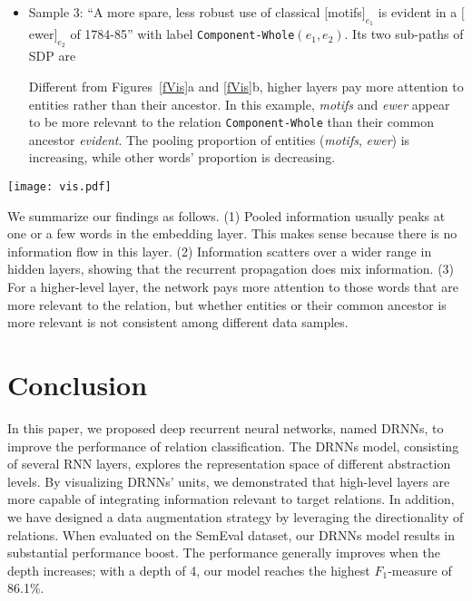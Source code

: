 \documentclass[11pt]{article}
\begin{document}
\begin{itemize}
\item Sample 3: ``A more spare, less robust use of classical $[$motifs$]_{e_1}$ is evident in a $[$ewer$]_{e_2}$ of 1784-85'' with label \verb|Component-Whole|$({e_1}, {e_2})$.
    Its two sub-paths of SDP are
 Different from Figures~\ref{fVis}a and \ref{fVis}b, higher layers pay more attention to entities rather than their ancestor. In this example, \textit{motifs} and \textit{ewer} appear to be more relevant to the relation \verb|Component-|\verb|Whole| than their common ancestor \textit{evident}.
The pooling proportion of entities (\textit{motifs}, \textit{ewer}) is increasing, while other words' proportion is decreasing.

\end{itemize}


\begin{figure*}[!t]
\centering
\texttt{[image: vis.pdf]}
\caption{Visualization of information propagation along multiple RNN layers.}
\label{fVis}
\end{figure*}
We summarize our findings as follows. (1) Pooled information usually peaks at one or a few words in the embedding layer. This makes sense because there is no information flow in this layer.  (2) Information scatters over a wider range in hidden layers, showing that the recurrent propagation does  mix information. (3) For a higher-level layer, the network pays more attention to those words that are more relevant to the relation, but whether entities or their common ancestor is more relevant is not consistent among different data samples.



\section{Conclusion}\label{sConclusion}
In this paper, we proposed deep recurrent neural networks, named DRNNs, to improve the performance of relation classification. The DRNNs model, consisting of several RNN layers, explores the representation space of different abstraction levels. By visualizing  DRNNs' units, we demonstrated that high-level layers are more capable of integrating information relevant to target relations. In addition, we have designed a data augmentation strategy by leveraging the directionality of relations.
When evaluated on the SemEval dataset, our DRNNs model results in substantial performance boost. The performance generally improves when the depth increases; with a depth of 4, our model reaches the highest $F_1$-measure of 86.1\%.
\end{document}
